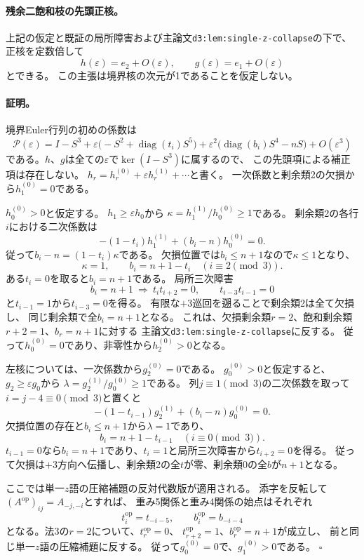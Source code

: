 \documentclass[11pt,a4paper]{ltjsarticle}
\begin{document}
\paragraph{残余二飽和枝の先頭正核。}
上記の仮定と既証の局所障害および主論文\texttt{d3:lem:single-z-collapse}の下で、
正核を定数倍して
\[
 h(\varepsilon)=e_2+O(\varepsilon),
 \qquad g(\varepsilon)=e_1+O(\varepsilon)
\]
とできる。
この主張は境界核の次元が1であることを仮定しない。
\paragraph{証明。}
境界Euler行列の初めの係数は
\[
 \mathscr P(\varepsilon)=I-S^3
 +\varepsilon\bigl(-S^2+\operatorname{diag}(t_i)S^5\bigr)
 +\varepsilon^2\bigl(\operatorname{diag}(b_i)S^4-nS\bigr)
 +O(\varepsilon^3)
\]
である。$h$、$g$は全ての$\varepsilon$で$\ker(I-S^3)$に属するので、
この先頭項による補正項は存在しない。
$h_r=h_r^{(0)}+\varepsilon h_r^{(1)}+\cdots$と書く。
一次係数と剰余類2の欠損から$h_1^{(0)}=0$である。

$h_0^{(0)}>0$と仮定する。
$h_1\ge\varepsilon h_0$から
$\kappa=h_1^{(1)}/h_0^{(0)}\ge1$である。
剰余類2の各行$i$における二次係数は
\[
 -(1-t_i)h_1^{(1)}+(b_i-n)h_0^{(0)}=0.
\]
従って$b_i-n=(1-t_i)\kappa$である。
欠損位置では$b_i\le n+1$なので$\kappa\le1$となり、
\[
 \kappa=1,\qquad b_i=n+1-t_i\quad(i\equiv2\pmod3).
\]
ある$t_i=0$を取ると$b_i=n+1$である。
局所三次障害
\[
 b_i=n+1\ \Longrightarrow\ t_it_{i+2}=0,\qquad t_{i-3}t_{i-1}=0
\]
と$t_{i-1}=1$から$t_{i-3}=0$を得る。
有限な$+3$巡回を遡ることで剰余類2は全て欠損し、
同じ剰余類で全$b_i=n+1$となる。
これは、欠損剰余類$r=2$、飽和剰余類$r+2=1$、$b_r=n+1$に対する
主論文\texttt{d3:lem:single-z-collapse}に反する。
従って$h_0^{(0)}=0$であり、非零性から$h_2^{(0)}>0$となる。

左核については、一次係数から$g_2^{(0)}=0$である。
$g_0^{(0)}>0$と仮定すると、$g_2\ge\varepsilon g_0$から
$\lambda=g_2^{(1)}/g_0^{(0)}\ge1$である。
列$j\equiv1\pmod3$の二次係数を取って$i=j-4\equiv0\pmod3$と置くと
\[
 -(1-t_{i-1})g_2^{(1)}+(b_i-n)g_0^{(0)}=0.
\]
欠損位置の存在と$b_i\le n+1$から$\lambda=1$であり、
\[
 b_i=n+1-t_{i-1}\quad(i\equiv0\pmod3).
\]
$t_{i-1}=0$なら$b_i=n+1$であり、$t_i=1$と局所三次障害から$t_{i+2}=0$を得る。
従って欠損は$+3$方向へ伝播し、剰余類2の全$t$が零、剰余類0の全$b$が$n+1$となる。

ここでは単一$z$語の圧縮補題の反対代数版が適用される。
添字を反転して$(A^{\mathrm{op}})_{ij}=A_{-j,-i}$とすれば、
重み5関係と重み4関係の始点はそれぞれ
\[
 t_i^{\mathrm{op}}=t_{-i-5},\qquad b_i^{\mathrm{op}}=b_{-i-4}
\]
となる。法3の$r=2$について、$t_r^{\mathrm{op}}=0$、
$t_{r+2}^{\mathrm{op}}=1$、$b_r^{\mathrm{op}}=n+1$が成立し、
前と同じ単一$z$語の圧縮補題に反する。
従って$g_0^{(0)}=0$で、$g_1^{(0)}>0$である。
\hfill$\square$
\end{document}
